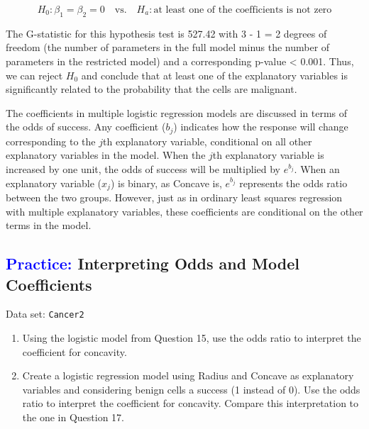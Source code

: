 \documentclass[
]{report}
\begin{document}
\[H_0: \beta_1 = \beta_2 = 0 \quad \text{vs.}\quad H_a: \text{at least one of the coefficients is not zero}\]

The G-statistic for this hypothesis test is 527.42 with 3 - 1 = 2 degrees of freedom (the number of parameters in the full model minus the number of parameters in the restricted model) and a corresponding p-value \textless{} 0.001. Thus, we can reject \(\scriptstyle H_0\) and conclude that at least one of the explanatory variables is significantly related to the probability that the cells are malignant.

The coefficients in multiple logistic regression models are discussed in terms of the odds of success. Any coefficient (\(\scriptstyle b_j\)) indicates how the response will change corresponding to the \(\scriptstyle j\)th explanatory variable, conditional on all other explanatory variables in the model. When the \(\scriptstyle j\)th explanatory variable is increased by one unit, the odds of success will be multiplied by \(\scriptstyle e^{b_j}\). When an explanatory variable (\(\scriptstyle x_j\)) is binary, as Concave is, \(\scriptstyle e^{b_j}\) represents the odds ratio between the two groups. However, just as in ordinary least squares regression with multiple explanatory variables, these coefficients are conditional on the other terms in the model.

\hypertarget{interpreting-odds-and-model-coefficients}{%
\subsection{\texorpdfstring{\textcolor{blue}{Practice:} Interpreting Odds and Model Coefficients}{ Interpreting Odds and Model Coefficients}}\label{interpreting-odds-and-model-coefficients}}

\vspace{-1em}

Data set: \texttt{Cancer2}

\begin{enumerate}
\def\labelenumi{\arabic{enumi}.}
\setcounter{enumi}{16}
\item
  Using the logistic model from Question 15, use the odds ratio to interpret the coefficient for concavity.
\item
  Create a logistic regression model using Radius and Concave as explanatory variables and considering
  benign cells a success (1 instead of 0). Use the odds ratio to interpret the coefficient for concavity. Compare this interpretation to the one in Question 17.
\end{enumerate}
\end{document}
